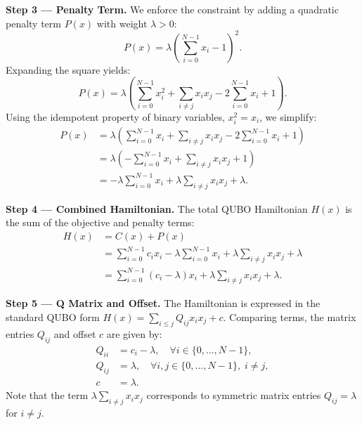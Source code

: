\documentclass[12pt]{article}
\begin{document}
\textbf{Step 3 --- Penalty Term.}
We enforce the constraint by adding a quadratic penalty term $P(x)$ with weight $\lambda > 0$:
\begin{equation}
    P(x) = \lambda \left( \sum_{i=0}^{N-1} x_i - 1 \right)^2.
\end{equation}
Expanding the square yields:
\begin{equation}
    P(x) = \lambda \left( \sum_{i=0}^{N-1} x_i^2 + \sum_{i \neq j} x_i x_j - 2 \sum_{i=0}^{N-1} x_i + 1 \right).
\end{equation}
Using the idempotent property of binary variables, $x_i^2 = x_i$, we simplify:
\begin{align}
    P(x) &= \lambda \left( \sum_{i=0}^{N-1} x_i + \sum_{i \neq j} x_i x_j - 2 \sum_{i=0}^{N-1} x_i + 1 \right) \\
    &= \lambda \left( -\sum_{i=0}^{N-1} x_i + \sum_{i \neq j} x_i x_j + 1 \right) \\
    &= -\lambda \sum_{i=0}^{N-1} x_i + \lambda \sum_{i \neq j} x_i x_j + \lambda.
\end{align}

\textbf{Step 4 --- Combined Hamiltonian.}
The total QUBO Hamiltonian $H(x)$ is the sum of the objective and penalty terms:
\begin{align}
    H(x) &= C(x) + P(x) \\
    &= \sum_{i=0}^{N-1} c_i x_i - \lambda \sum_{i=0}^{N-1} x_i + \lambda \sum_{i \neq j} x_i x_j + \lambda \\
    &= \sum_{i=0}^{N-1} (c_i - \lambda) x_i + \lambda \sum_{i \neq j} x_i x_j + \lambda.
\end{align}

\textbf{Step 5 --- Q Matrix and Offset.}
The Hamiltonian is expressed in the standard QUBO form $H(x) = \sum_{i \le j} Q_{ij} x_i x_j + c$. Comparing terms, the matrix entries $Q_{ij}$ and offset $c$ are given by:
\begin{align}
    Q_{ii} &= c_i - \lambda, \quad \forall i \in \{0, \dots, N-1\}, \\
    Q_{ij} &= \lambda, \quad \forall i, j \in \{0, \dots, N-1\}, \; i \neq j, \\
    c &= \lambda.
\end{align}
Note that the term $\lambda \sum_{i \neq j} x_i x_j$ corresponds to symmetric matrix entries $Q_{ij} = \lambda$ for $i \neq j$.
\end{document}
